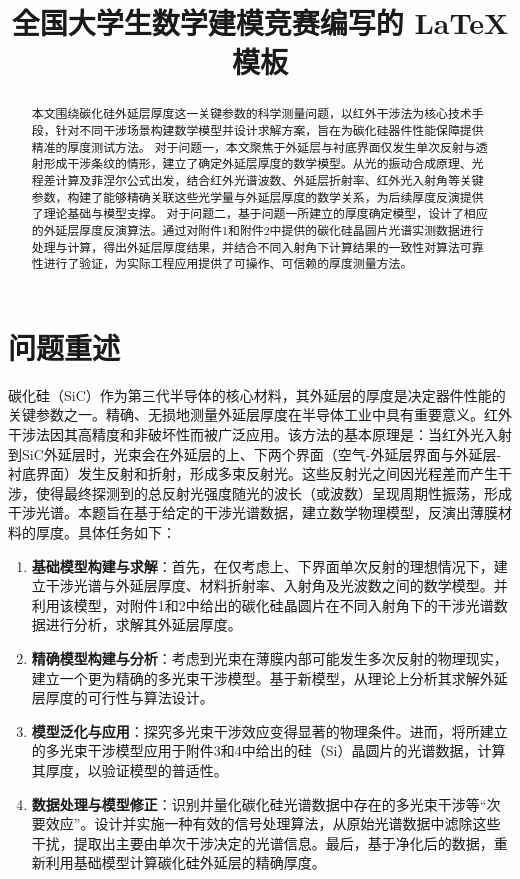 \documentclass[withoutpreface,bwprint]{cumcmthesis} %
\title{全国大学生数学建模竞赛编写的 \LaTeX{} 模板}
\begin{document}
\maketitle
\begin{abstract}
    本文围绕碳化硅外延层厚度这一关键参数的科学测量问题，以红外干涉法为核心技术手段，针对不同干涉场景构建数学模型并设计求解方案，旨在为碳化硅器件性能保障提供精准的厚度测试方法。
    对于问题一，本文聚焦于外延层与衬底界面仅发生单次反射与透射形成干涉条纹的情形，建立了确定外延层厚度的数学模型。从光的振动合成原理、光程差计算及菲涅尔公式出发，结合红外光谱波数、外延层折射率、红外光入射角等关键参数，构建了能够精确关联这些光学量与外延层厚度的数学关系，为后续厚度反演提供了理论基础与模型支撑。
    对于问题二，基于问题一所建立的厚度确定模型，设计了相应的外延层厚度反演算法。通过对附件1和附件2中提供的碳化硅晶圆片光谱实测数据进行处理与计算，得出外延层厚度结果，并结合不同入射角下计算结果的一致性对算法可靠性进行了验证，为实际工程应用提供了可操作、可信赖的厚度测量方法。
\end{abstract}


\section{问题重述}
碳化硅（SiC）作为第三代半导体的核心材料，其外延层的厚度是决定器件性能的关键参数之一。精确、无损地测量外延层厚度在半导体工业中具有重要意义。红外干涉法因其高精度和非破坏性而被广泛应用。该方法的基本原理是：当红外光入射到SiC外延层时，光束会在外延层的上、下两个界面（空气-外延层界面与外延层-衬底界面）发生反射和折射，形成多束反射光。这些反射光之间因光程差而产生干涉，使得最终探测到的总反射光强度随光的波长（或波数）呈现周期性振荡，形成干涉光谱。本题旨在基于给定的干涉光谱数据，建立数学物理模型，反演出薄膜材料的厚度。具体任务如下：
\begin{enumerate}
    \item \textbf{基础模型构建与求解}：首先，在仅考虑上、下界面单次反射的理想情况下，建立干涉光谱与外延层厚度、材料折射率、入射角及光波数之间的数学模型。并利用该模型，对附件1和2中给出的碳化硅晶圆片在不同入射角下的干涉光谱数据进行分析，求解其外延层厚度。
    \item \textbf{精确模型构建与分析}：考虑到光束在薄膜内部可能发生多次反射的物理现实，建立一个更为精确的多光束干涉模型。基于新模型，从理论上分析其求解外延层厚度的可行性与算法设计。
    \item \textbf{模型泛化与应用}：探究多光束干涉效应变得显著的物理条件。进而，将所建立的多光束干涉模型应用于附件3和4中给出的硅（Si）晶圆片的光谱数据，计算其厚度，以验证模型的普适性。
    \item \textbf{数据处理与模型修正}：识别并量化碳化硅光谱数据中存在的多光束干涉等“次要效应”。设计并实施一种有效的信号处理算法，从原始光谱数据中滤除这些干扰，提取出主要由单次干涉决定的光谱信息。最后，基于净化后的数据，重新利用基础模型计算碳化硅外延层的精确厚度。
\end{enumerate}
\end{document}
